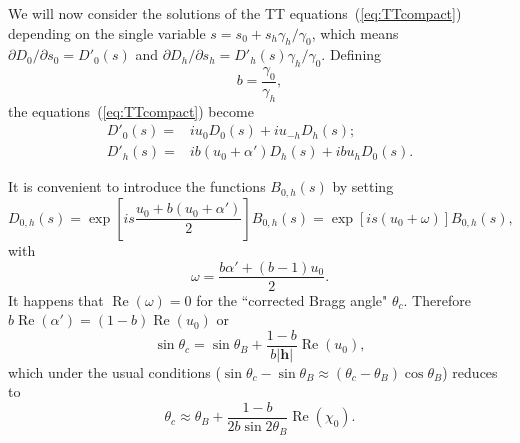 \documentclass[preprint]{iucr}              %
\newcommand{\todo}[1]{{\color{red}[TODO: "#1'']}}
\newcommand{\inblue}[1]{{\color{blue}#1}}
\begin{document}
We will now consider the solutions of the TT equations~(\ref{eq:TTcompact}) depending on the single variable $s=s_0+s_h \gamma_h/\gamma_0$, which means 
$\partial D_{0} / \partial  s_{0}=D'_{0}(s)$ and $\partial D_{h} / \partial s_{h}=D'_{h}(s)\gamma_h/\gamma_0$.
Defining 
\begin{equation}\label{eq:b}
b = \frac{\gamma_0}{\gamma_h},    
\end{equation}
the equations~(\ref{eq:TTcompact}) become
\begin{subequations}
\label{eq:TTlaue}
\begin{align}
D'_0(s) =& i u_0 D_0(s) + i u_{-h} D_h(s); \\
D'_h(s) =& i b (u_0 + \alpha') D_h(s) + i b u_{h} D_0(s).
\end{align}
\end{subequations}

It is convenient to introduce the functions $B_{0,h}(s)$ by setting
\begin{equation}
\label{eq:Bdefinition}
D_{0,h}(s) = \exp \left[ i s \frac{u_0 + b (u_0+\alpha')}{2} \right] B_{0,h}(s) = \exp[i s (u_0+\omega)] B_{0,h}(s),  
\end{equation}
with
\begin{equation}\label{eq:omega}
    \omega=\frac{ b \alpha' + (b-1) u_0}{2}.
\end{equation} 
\inblue{
It happens that $\operatorname{Re}(\omega)=0$ for the ``corrected Bragg angle" $\theta_c$. Therefore $b\operatorname{Re}(\alpha')=(1-b)\operatorname{Re}(u_0)$ or 
\begin{equation}\label{eq:correctedBraggAngleExact}
   \sin\theta_c = \sin\theta_B + \frac{1-b}{b|\textbf{h}|} \operatorname{Re}(u_0),  
\end{equation}
which under the usual conditions ($\sin\theta_c-\sin\theta_B \approx  (\theta_c-\theta_B) \cos\theta_B$) reduces to
\begin{equation}\label{eq:correctedBraggAngle}
   \theta_c \approx \theta_B + \frac{1-b}{2 b \sin2\theta_B} \operatorname{Re}(\chi_0).  
\end{equation}
}


\end{document}
